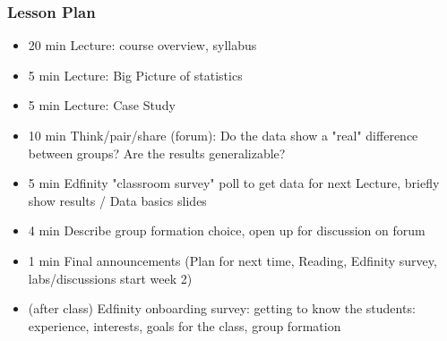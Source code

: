 \begin{frame}
    \frametitle{Lesson Plan}
    \begin{itemize}
        \item 20 min Lecture: course overview, syllabus
        \item 5 min Lecture: Big Picture of statistics
        \item 5 min Lecture: Case Study
        \item 10 min Think/pair/share (forum): Do the data show a "real" difference between groups? Are the results generalizable?
        \item 5 min Edfinity "classroom survey" poll to get data for next Lecture, briefly show results / Data basics slides
        \item 4 min Describe group formation choice, open up for discussion on forum 
        \item 1 min Final announcements (Plan for next time, Reading, Edfinity survey, labs/discussions start week 2)
        \item (after class) Edfinity onboarding survey: getting to know the students: experience, interests, goals for the class, group formation
    \end{itemize}
\end{frame}
    


